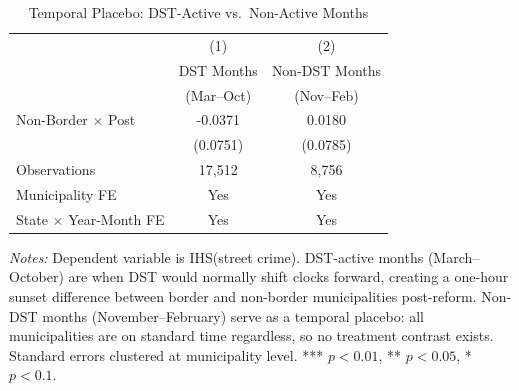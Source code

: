 \begin{table}[htbp]
\centering
\caption{Temporal Placebo: DST-Active vs.\ Non-Active Months}
\label{tab:temporal}
\begin{threeparttable}
\begin{tabular}{lcc}
\toprule
 & (1) & (2) \\
 & DST Months & Non-DST Months \\
 & (Mar--Oct) & (Nov--Feb) \\
\midrule
Non-Border $\times$ Post & -0.0371 & 0.0180 \\
 & (0.0751) & (0.0785) \\
\midrule
Observations & 17,512 & 8,756 \\
Municipality FE & Yes & Yes \\
State $\times$ Year-Month FE & Yes & Yes \\
\bottomrule
\end{tabular}
\begin{tablenotes}[flushleft]\small
\item \textit{Notes:} Dependent variable is IHS(street crime). DST-active months (March--October) are when DST would normally shift clocks forward, creating a one-hour sunset difference between border and non-border municipalities post-reform. Non-DST months (November--February) serve as a temporal placebo: all municipalities are on standard time regardless, so no treatment contrast exists. Standard errors clustered at municipality level. *** $p<0.01$, ** $p<0.05$, * $p<0.1$.
\end{tablenotes}
\end{threeparttable}
\end{table}
